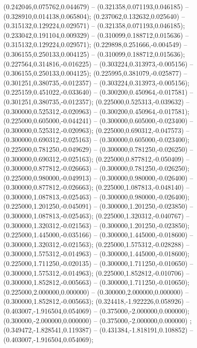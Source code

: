  (0.242046,0.075762,0.044679) -- (0.321358,0.071193,0.046185) -- (0.328910,0.014138,0.065804);
 (0.237062,0.132632,0.025640) -- (0.315132,0.129224,0.029571) -- (0.321358,0.071193,0.046185);
 (0.233042,0.191104,0.009329) -- (0.310099,0.188712,0.015636) -- (0.315132,0.129224,0.029571);
 (0.229898,0.251666,-0.004549) -- (0.306155,0.250133,0.004125) -- (0.310099,0.188712,0.015636);
 (0.227564,0.314816,-0.016225) -- (0.303224,0.313973,-0.005156) -- (0.306155,0.250133,0.004125);
 (0.225995,0.381079,-0.025877) -- (0.301251,0.380735,-0.012357) -- (0.303224,0.313973,-0.005156);
 (0.225159,0.451022,-0.033640) -- (0.300200,0.450964,-0.017581) -- (0.301251,0.380735,-0.012357);
 (0.225000,0.525313,-0.039632) -- (0.300000,0.525312,-0.020963) -- (0.300200,0.450964,-0.017581);
 (0.225000,0.605000,-0.044241) -- (0.300000,0.605000,-0.023400) -- (0.300000,0.525312,-0.020963);
 (0.225000,0.690312,-0.047573) -- (0.300000,0.690312,-0.025163) -- (0.300000,0.605000,-0.023400);
 (0.225000,0.781250,-0.049629) -- (0.300000,0.781250,-0.026250) -- (0.300000,0.690312,-0.025163);
 (0.225000,0.877812,-0.050409) -- (0.300000,0.877812,-0.026663) -- (0.300000,0.781250,-0.026250);
 (0.225000,0.980000,-0.049913) -- (0.300000,0.980000,-0.026400) -- (0.300000,0.877812,-0.026663);
 (0.225000,1.087813,-0.048140) -- (0.300000,1.087813,-0.025463) -- (0.300000,0.980000,-0.026400);
 (0.225000,1.201250,-0.045091) -- (0.300000,1.201250,-0.023850) -- (0.300000,1.087813,-0.025463);
 (0.225000,1.320312,-0.040767) -- (0.300000,1.320312,-0.021563) -- (0.300000,1.201250,-0.023850);
 (0.225000,1.445000,-0.035166) -- (0.300000,1.445000,-0.018600) -- (0.300000,1.320312,-0.021563);
 (0.225000,1.575312,-0.028288) -- (0.300000,1.575312,-0.014963) -- (0.300000,1.445000,-0.018600);
 (0.225000,1.711250,-0.020135) -- (0.300000,1.711250,-0.010650) -- (0.300000,1.575312,-0.014963);
 (0.225000,1.852812,-0.010706) -- (0.300000,1.852812,-0.005663) -- (0.300000,1.711250,-0.010650);
 (0.225000,2.000000,0.000000) -- (0.300000,2.000000,0.000000) -- (0.300000,1.852812,-0.005663);
 (0.324418,-1.922226,0.058926) -- (0.403007,-1.916504,0.054069) -- (0.375000,-2.000000,0.000000);
 (0.300000,-2.000000,0.000000) -- (0.375000,-2.000000,0.000000) ;
 (0.349472,-1.828541,0.119387) -- (0.431384,-1.818191,0.108852) -- (0.403007,-1.916504,0.054069);
